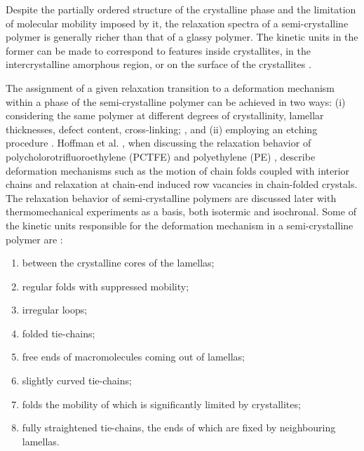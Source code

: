 Despite the partially ordered structure of the crystalline phase and the limitation of molecular mobility imposed by it, the relaxation spectra of a semi-crystalline polymer is generally richer than that of a glassy polymer.
The kinetic units in the former can be made to correspond to features inside crystallites, in the intercrystalline amorphous region, or on the surface of the crystallites \citep{ferryViscoelasticPropertiesPolymers1980, arzhakovRelaxationPhysicalMechanical2019}.

The assignment of a given relaxation transition to a deformation mechanism within a phase of the semi-crystalline polymer can be achieved in two ways: (i) considering the same polymer at different degrees of crystallinity, lamellar thicknesses, defect content, cross-linking; \citep{ferryViscoelasticPropertiesPolymers1980}, and (ii) employing an etching procedure \citep{arzhakovRelaxationPhysicalMechanical2019}.
Hoffman et al. \citep{hoffmanAnalysisRelaxationsPolychlorotrifluoroethylene2007}, when discussing the relaxation behavior of polycholorotrifluoroethylene (PCTFE)   and polyethylene (PE)  , describe deformation mechanisms such as the motion of chain folds coupled with interior chains and relaxation at chain-end induced row vacancies in chain-folded crystals.
The relaxation behavior of semi-crystalline polymers are discussed later with thermomechanical experiments as a basis, both isotermic and isochronal.
Some of the kinetic units responsible for the deformation mechanism in a semi-crystalline polymer are \citep{arzhakovRelaxationPhysicalMechanical2019}:
\begin{enumerate}
	\item between the crystalline cores of the lamellas;
	\item regular folds with suppressed mobility;
	\item irregular loops;
	\item folded tie-chains;
	\item free ends of macromolecules coming out of lamellas;
	\item slightly curved tie-chains;
	\item folds the mobility of which is significantly limited by crystallites;
	\item fully straightened tie-chains, the ends of which are fixed by neighbouring lamellas.
\end{enumerate}
